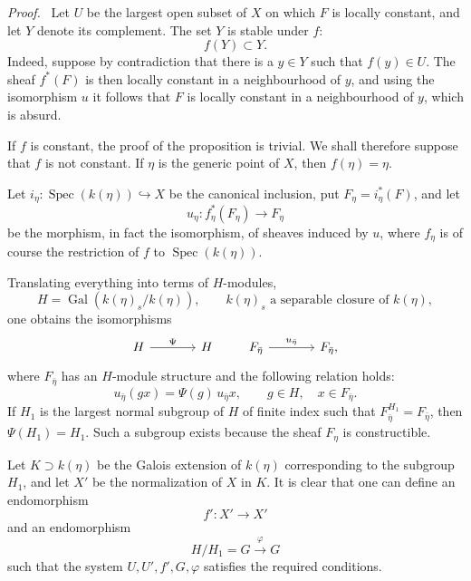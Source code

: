 \documentclass[11pt]{article}
\newenvironment{prooftext}[1][Proof]{\par\noindent\emph{#1.}\ }{\par\medskip}
\DeclareMathOperator{\Spec}{Spec}
\providecommand{\Gal}{\operatorname{Gal}}
\providecommand{\Spec}{\operatorname{Spec}}
\providecommand{\Spec}{\operatorname{Spec}}
\providecommand{\Spec}{\operatorname{Spec}}
\providecommand{\Spec}{\operatorname{Spec}}
\providecommand{\Gal}{\operatorname{Gal}}
\begin{document}
\begin{prooftext}[Proof]
Let $U$ be the largest open subset of $X$ on which $F$ is locally constant, and let $Y$ denote its complement. The set $Y$ is stable under $f$:
\[
f(Y)\subset Y.
\]
Indeed, suppose by contradiction that there is a $y\in Y$ such that $f(y)\in U$. The sheaf $f^*(F)$ is then locally constant in a neighbourhood of $y$, and using the isomorphism $u$ it follows that $F$ is locally constant in a neighbourhood of $y$, which is absurd.

If $f$ is constant, the proof of the proposition is trivial. We shall therefore suppose that $f$ is not constant. If $\eta$ is the generic point of $X$, then $f(\eta)=\eta$.

Let $i_\eta:\Spec(k(\eta))\hookrightarrow X$ be the canonical inclusion, put $F_\eta=i_\eta^*(F)$, and let
\[
u_\eta:f_\eta^*(F_\eta)\longrightarrow F_\eta
\]
be the morphism, in fact the isomorphism, of sheaves induced by $u$, where $f_\eta$ is of course the restriction of $f$ to $\Spec(k(\eta))$.

Translating everything into terms of $H$-modules,
\[
H=\Gal(k(\eta)_s/k(\eta)),\qquad k(\eta)_s\text{ a separable closure of }k(\eta),
\]
one obtains the isomorphisms
\[
\begin{tikzcd}[column sep=large]
H \arrow[r,"\Psi"] & H
\end{tikzcd}
\qquad
\begin{tikzcd}[column sep=large]
F_{\bar\eta} \arrow[r,"u_{\bar\eta}"] & F_{\bar\eta},
\end{tikzcd}
\]
where $F_{\bar\eta}$ has an $H$-module structure and the following relation holds:
\[
u_{\bar\eta}(gx)=\Psi(g)\,u_{\bar\eta}x,
\qquad g\in H,
\quad x\in F_{\bar\eta}.
\]
If $H_1$ is the largest normal subgroup of $H$ of finite index such that $F_{\bar\eta}^{H_1}=F_{\bar\eta}$, then $\Psi(H_1)=H_1$. Such a subgroup exists because the sheaf $F_\eta$ is constructible.

Let $K\supset k(\eta)$ be the Galois extension of $k(\eta)$ corresponding to the subgroup $H_1$, and let $X'$ be the normalization of $X$ in $K$. It is clear that one can define an endomorphism
\[
f':X'\longrightarrow X'
\]
and an endomorphism
\[
H/H_1=G\xrightarrow{\varphi}G
\]
such that the system $U,U',f',G,\varphi$ satisfies the required conditions.
\end{prooftext}
\end{document}
